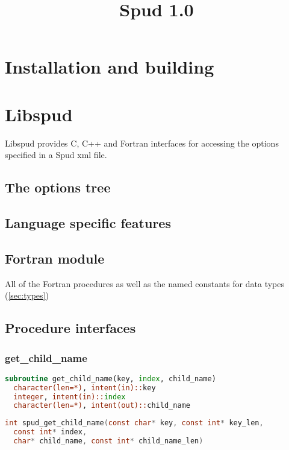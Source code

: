 \documentclass[a4paper, 11pt]{book}
\title{Spud 1.0}
\begin{document}
\maketitle

\tableofcontents
\chapter{Installation and building}

\chapter{Libspud}

Libspud provides C, C++ and Fortran interfaces for accessing the options
specified in a Spud xml file. 

\section{The options tree}

\section{Language specific features}

\section{Fortran module}

All of the Fortran procedures as well as the named constants for data types
(\ref{sec:types}) 

\section{Procedure interfaces}
\lstset{language=Fortran}

\subsection{get\_child\_name}

\begin{lstlisting}[language=fortran]
subroutine get_child_name(key, index, child_name)    
  character(len=*), intent(in)::key 
  integer, intent(in)::index
  character(len=*), intent(out)::child_name
\end{lstlisting}

\begin{lstlisting}[language=C]
int spud_get_child_name(const char* key, const int* key_len, 
  const int* index, 
  char* child_name, const int* child_name_len)
\end{lstlisting}
\end{document}
